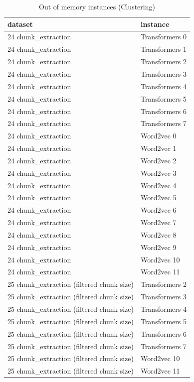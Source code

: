 \begin{table}[ht]
\centering
\begin{tabular}{ll}
\hline
dataset & instance \\ 
\hline
24 chunk\_extraction & Transformers 0 \\ 
24 chunk\_extraction & Transformers 1 \\ 
24 chunk\_extraction & Transformers 2 \\ 
24 chunk\_extraction & Transformers 3 \\ 
24 chunk\_extraction & Transformers 4 \\ 
24 chunk\_extraction & Transformers 5 \\ 
24 chunk\_extraction & Transformers 6 \\ 
24 chunk\_extraction & Transformers 7 \\ 
24 chunk\_extraction & Word2vec 0 \\ 
24 chunk\_extraction & Word2vec 1 \\ 
24 chunk\_extraction & Word2vec 2 \\ 
24 chunk\_extraction & Word2vec 3 \\ 
24 chunk\_extraction & Word2vec 4 \\ 
24 chunk\_extraction & Word2vec 5 \\ 
24 chunk\_extraction & Word2vec 6 \\ 
24 chunk\_extraction & Word2vec 7 \\ 
24 chunk\_extraction & Word2vec 8 \\ 
24 chunk\_extraction & Word2vec 9 \\ 
24 chunk\_extraction & Word2vec 10 \\ 
24 chunk\_extraction & Word2vec 11 \\ 
25 chunk\_extraction (filtered chunk size) & Transformers 2 \\ 
25 chunk\_extraction (filtered chunk size) & Transformers 3 \\ 
25 chunk\_extraction (filtered chunk size) & Transformers 4 \\ 
25 chunk\_extraction (filtered chunk size) & Transformers 5 \\ 
25 chunk\_extraction (filtered chunk size) & Transformers 6 \\ 
25 chunk\_extraction (filtered chunk size) & Transformers 7 \\ 
25 chunk\_extraction (filtered chunk size) & Word2vec 10 \\ 
25 chunk\_extraction (filtered chunk size) & Word2vec 11 \\ 
\hline
\end{tabular}
\caption{Out of memory instances (Clustering)}
\label{tab:annexe:out_of_memory_instances_clustering}
\end{table}

